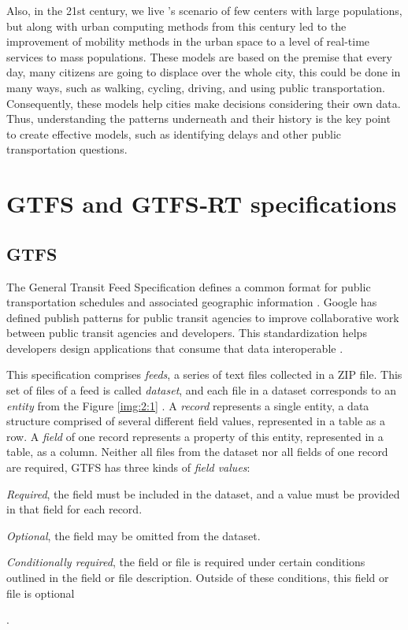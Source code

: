 Also, in the 21st century, we live 's scenario
of few centers with large populations, but along with urban computing methods 
from this century led to the improvement of mobility methods in the urban space
to a level of real-time services to mass populations. These models 
are based on the premise that every day, many citizens are going to
displace over the whole city, this could be done in many ways, such as 
walking, cycling, driving, and using public transportation. Consequently, these models help cities make decisions considering their own data.
Thus, understanding the patterns underneath and their history is the key point to create effective models, such as
identifying delays and other public transportation questions.



\section{GTFS and GTFS‑RT specifications}

\subsection{GTFS}
The General Transit Feed Specification defines a common format for
public transportation schedules and associated geographic information \cite{GTFS}.
Google has defined publish patterns for public transit agencies to improve collaborative work between public transit agencies and 
developers. This standardization helps developers design applications that consume that data interoperable \cite{GTFSpioneering}. 


This specification comprises {\em feeds}, a series of text files collected
in a ZIP file. This set of files of a feed is called {\em dataset}, and each file in a 
dataset corresponds to an {\em entity} from the Figure \ref{img:2:1} \cite{wong2013}. A {\em record}  represents a single entity, a data structure comprised of several different field values, represented in a table as a row. A {\em field} of one record represents a property
of this entity, represented in a table, as a column. Neither all files from the dataset nor
all fields of one record are required, GTFS has three kinds of {\em field values}:
\begin{enumerate*}
    \item {\em Required}, the field must be included in the dataset, and a value must be provided in that field for each record.
    \item {\em Optional}, the field may be omitted from the dataset.
    \item {\em Conditionally required}, the field or file is required under certain conditions outlined in the field or file description. Outside of these conditions, this field or file is optional
\end{enumerate*}
\cite{GTFS}.

